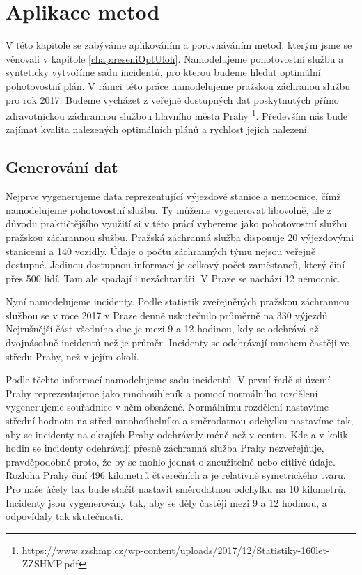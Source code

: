 \chapter{Aplikace metod}

V této kapitole se zabýváme aplikováním a porovnáváním metod, kterým jsme se věnovali v kapitole \ref{chap:reseniOptUloh}.
Namodelujeme pohotovostní službu a synteticky vytvoříme sadu incidentů, pro kterou budeme hledat optimální pohotovostní plán.
V rámci této práce namodelujeme pražskou záchranou službu pro rok 2017. Budeme vycházet z veřejně dostupných dat
poskytnutých přímo zdravotnickou záchrannou službou hlavního města Prahy
\footnote{https://www.zzshmp.cz/wp-content/uploads/2017/12/Statistiky-160let-ZZSHMP.pdf}.
Především nás bude zajímat kvalita nalezených optimálních plánů a rychlost jejich nalezení.

\section{Generování dat}

Nejprve vygenerujeme data reprezentující výjezdové stanice a nemocnice, čímž namodelujeme pohotovostní službu.
Ty můžeme vygenerovat libovolně, ale z důvodu praktičtějšího využití
si v této prácí vybereme jako pohotovostní službu pražskou záchrannou službu.
Pražská záchranná služba disponuje 20 výjezdovými stanicemi a 140 vozidly.
Údaje o počtu záchranných týmu nejsou veřejně dostupné. Jedinou dostupnou informací je celkový počet zaměstanců, který činí přes 500 lidí.
Tam ale spadají i nezáchranáři.
V Praze se nachází 12 nemocnic.

Nyní namodelujeme incidenty. Podle statistik zveřejněných pražskou záchrannou službou se v roce 2017 v Praze denně uskutečnilo průměrně na 330 výjezdů.
Nejrušnější část všedního dne je mezi 9 a 12 hodinou, kdy se odehrává až dvojnásobně incidentů než je průměr.
Incidenty se odehrávají mnohem častěji ve středu Prahy, než v jejím okolí. 

Podle těchto informací namodelujeme sadu incidentů.
V první řadě si území Prahy reprezentujeme jako mnohoúhleník a pomocí normálního rozdělení vygenerujeme souřadnice v něm obsažené.
Normálnímu rozdělení nastavíme střední hodnotu na střed mnohoúhelníka a směrodatnou odchylku nastavíme tak, aby se incidenty na okrajích Prahy odehrávaly méně než v centru. 
Kde a v kolik hodin se incidenty odehrávají přesně záchranná služba Prahy nezveřejňuje, pravděpodobně proto, že by se mohlo jednat o zneužitelné nebo citlivé údaje.
Rozloha Prahy činí 496 kilometrů čtverečních a je relativně symetrického tvaru. Pro naše účely tak bude stačit nastavit směrodatnou odchylku na 10 kilometrů.
Incidenty jsou vygenerovány tak, aby se děly častěji mezi 9 a 12 hodinou, a odpovídaly tak skutečnosti.

